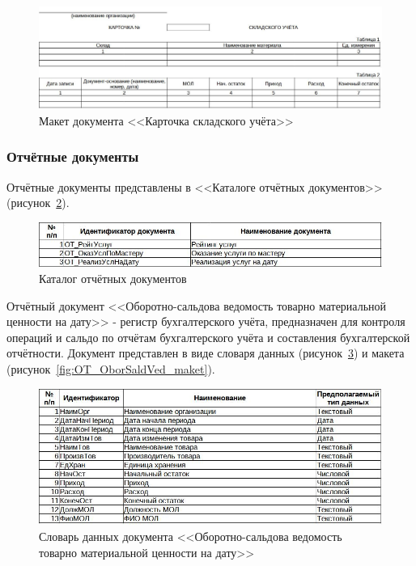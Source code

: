 \documentclass[12pt, a4paper, simple]{eskdtext}
\begin{document}
    \begin{figure}[!h]
        \centering
        \includegraphics[width=14cm]
            {_docs/ОП_КартСклУч_макет.jpg}
        \caption{Макет документа <<Карточка складского учёта>>}
        \label{fig:od_KartSklYch_maket}
    \end{figure}

    \subsubsection{Отчётные документы}

    Отчётные документы представлены в <<Каталоге отчётных документов>> (рисунок~\ref{fig:OT}).
    
    \begin{figure}[!h]
        \centering
        \includegraphics[width=14cm]
            {_docs/ОТ_.jpg}
        \caption{Каталог отчётных документов}
        \label{fig:OT}
    \end{figure}

    \newpage

    Отчётный документ <<Оборотно-сальдова ведомость товарно материальной ценности на дату>>
    - регистр бухгалтерского учёта, предназначен для контроля операций
    и сальдо по отчётам бухгалтерского учёта и составления бухгалтерской отчётности.
    Документ представлен в виде словаря данных (рисунок~\ref{fig:OT_OborSaldVed_tipi})
    и макета (рисунок~\ref{fig:OT_OborSaldVed_maket}).

    \begin{figure}[!h]
        \centering
        \includegraphics[width=14cm]
            {_docs/ОТ_ОборСальдВед_типы.jpg}
        \caption{Словарь данных документа <<Оборотно-сальдова ведомость товарно материальной ценности на дату>>}
        \label{fig:OT_OborSaldVed_tipi}
    \end{figure}
\end{document}
